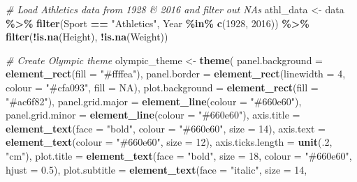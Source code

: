 \documentclass[
]{article}
\newenvironment{Shaded}{\begin{snugshade}}{\end{snugshade}}
\newcommand{\AttributeTok}[1]{\textcolor[rgb]{0.13,0.29,0.53}{#1}}
\newcommand{\CommentTok}[1]{\textcolor[rgb]{0.56,0.35,0.01}{\textit{#1}}}
\newcommand{\ConstantTok}[1]{\textcolor[rgb]{0.56,0.35,0.01}{#1}}
\newcommand{\DecValTok}[1]{\textcolor[rgb]{0.00,0.00,0.81}{#1}}
\newcommand{\FloatTok}[1]{\textcolor[rgb]{0.00,0.00,0.81}{#1}}
\newcommand{\FunctionTok}[1]{\textcolor[rgb]{0.13,0.29,0.53}{\textbf{#1}}}
\newcommand{\NormalTok}[1]{#1}
\newcommand{\OtherTok}[1]{\textcolor[rgb]{0.56,0.35,0.01}{#1}}
\newcommand{\SpecialCharTok}[1]{\textcolor[rgb]{0.81,0.36,0.00}{\textbf{#1}}}
\newcommand{\StringTok}[1]{\textcolor[rgb]{0.31,0.60,0.02}{#1}}
\begin{document}
\begin{Shaded}
\begin{Highlighting}[]
\CommentTok{\# Load Athletics data from 1928 \& 2016 and filter out NA\textquotesingle{}s}
\NormalTok{athl\_data }\OtherTok{\textless{}{-}}\NormalTok{ data }\SpecialCharTok{\%\textgreater{}\%}
  \FunctionTok{filter}\NormalTok{(Sport }\SpecialCharTok{==} \StringTok{"Athletics"}\NormalTok{,}
\NormalTok{         Year }\SpecialCharTok{\%in\%} \FunctionTok{c}\NormalTok{(}\DecValTok{1928}\NormalTok{, }\DecValTok{2016}\NormalTok{)) }\SpecialCharTok{\%\textgreater{}\%}
  \FunctionTok{filter}\NormalTok{(}\SpecialCharTok{!}\FunctionTok{is.na}\NormalTok{(Height), }\SpecialCharTok{!}\FunctionTok{is.na}\NormalTok{(Weight))}

\CommentTok{\# Create Olympic theme}
\NormalTok{olympic\_theme }\OtherTok{\textless{}{-}} \FunctionTok{theme}\NormalTok{(}
  \AttributeTok{panel.background =} \FunctionTok{element\_rect}\NormalTok{(}\AttributeTok{fill =} \StringTok{"\#ffffea"}\NormalTok{),}
  \AttributeTok{panel.border =} \FunctionTok{element\_rect}\NormalTok{(}\AttributeTok{linewidth =} \DecValTok{4}\NormalTok{, }\AttributeTok{colour =} \StringTok{"\#cfa093"}\NormalTok{, }\AttributeTok{fill =} \ConstantTok{NA}\NormalTok{),}
  \AttributeTok{plot.background =} \FunctionTok{element\_rect}\NormalTok{(}\AttributeTok{fill =} \StringTok{"\#ac6f82"}\NormalTok{),}
  \AttributeTok{panel.grid.major =} \FunctionTok{element\_line}\NormalTok{(}\AttributeTok{colour =} \StringTok{"\#660e60"}\NormalTok{),}
  \AttributeTok{panel.grid.minor =} \FunctionTok{element\_line}\NormalTok{(}\AttributeTok{colour =} \StringTok{"\#660e60"}\NormalTok{),}
  \AttributeTok{axis.title =} \FunctionTok{element\_text}\NormalTok{(}\AttributeTok{face =} \StringTok{"bold"}\NormalTok{, }\AttributeTok{colour =} \StringTok{"\#660e60"}\NormalTok{, }\AttributeTok{size =} \DecValTok{14}\NormalTok{),}
  \AttributeTok{axis.text =} \FunctionTok{element\_text}\NormalTok{(}\AttributeTok{colour =} \StringTok{"\#660e60"}\NormalTok{, }\AttributeTok{size =} \DecValTok{12}\NormalTok{),}
  \AttributeTok{axis.ticks.length =} \FunctionTok{unit}\NormalTok{(.}\DecValTok{2}\NormalTok{, }\StringTok{"cm"}\NormalTok{),}
  \AttributeTok{plot.title =} \FunctionTok{element\_text}\NormalTok{(}\AttributeTok{face =} \StringTok{"bold"}\NormalTok{, }\AttributeTok{size =} \DecValTok{18}\NormalTok{,}
                            \AttributeTok{colour =} \StringTok{"\#660e60"}\NormalTok{, }\AttributeTok{hjust =} \FloatTok{0.5}\NormalTok{),}
  \AttributeTok{plot.subtitle =} \FunctionTok{element\_text}\NormalTok{(}\AttributeTok{face =} \StringTok{"italic"}\NormalTok{, }\AttributeTok{size =} \DecValTok{14}\NormalTok{,}

\end{Highlighting}
\end{Shaded}
\end{document}
